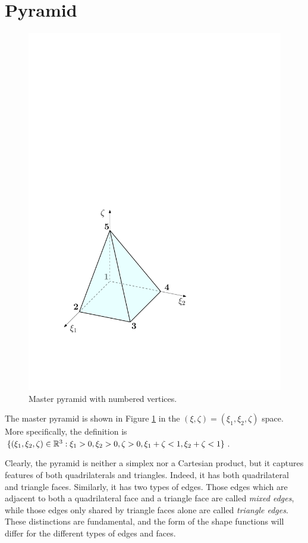 \section{Pyramid}
\label{sec:Pyramid}

\begin{figure}[!ht]
\begin{center}
\includegraphics[scale=0.5]{./figures/MasterPyramid.pdf}
\caption{Master pyramid with numbered vertices.}
\label{fig:MasterPyramid}
\end{center}
\end{figure}

The master pyramid is shown in Figure \ref{fig:MasterPyramid} in the $(\xi,\zeta)=(\xi_1,\xi_2,\zeta)$ space.
More specifically, the definition is $\{(\xi_1,\xi_2,\zeta)\in\mathbb{R}^3:\xi_1>0,\xi_2>0,\zeta>0,\xi_1+\zeta<1,\xi_2+\zeta<1\}$.

Clearly, the pyramid is neither a simplex nor a Cartesian product, but it captures features of both quadrilaterals and triangles.
Indeed, it has both quadrilateral and triangle faces. 
Similarly, it has two types of edges. 
Those edges which are adjacent to both a quadrilateral face and a triangle face are called \textit{mixed edges}, while those edges only shared by triangle faces alone are called \textit{triangle edges}. 
These distinctions are fundamental, and the form of the shape functions will differ for the different types of edges and faces.

